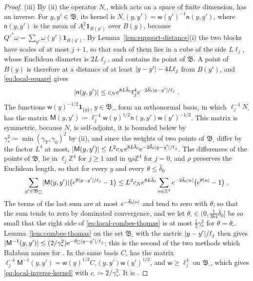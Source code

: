 \documentclass[11pt]{preprint}
\DeclarePairedDelimiter{\abs}{\lvert}{\rvert}
\numberwithin{equation}{section}
\theoremstyle{definition}
\theoremstyle{remark}
\theoremstyle{plain}
\begin{document}
\begin{proof}
(iii) By (ii) the operator $N_\square$, which acts on a space of finite dimension, has an inverse. For $y, y' \in \mathfrak B_\square$ its kernel is $N_\square(y, y') = \mathsf w(y')^{-1}\mathsf n(y, y')$, where $\mathsf n(y, y')$ is the mean of $A_\square^2\mathbf 1_{B(y')}$ over $B(y)$, because $Q'^*\omega = \sum_{y'}\omega(y')\mathbf 1_{B(y')}$. By Lemma~\ref{lem:support-distance}(i) the two blocks have scales of at most $j + 1$, so that each of them lies in a cube of the side $L\ell_j$, whose Euclidean diameter is $2L\ell_j$, and contains its point of $\mathfrak B$. A point of $B(y)$ is therefore at a distance of at least $\abs{y - y'} - 4L\ell_j$ from $B(y')$, and \eqref{eq:local-square} gives
\begin{equation}\label{eq:local-kernel}
    \abs{\mathsf n(y, y')} \leq c_Ne^{8L\bar\delta_0}\ell_j^4e^{-2\bar\delta_0\abs{y - y'}/\ell_j}\;.
\end{equation}
The functions $\mathsf w(y)^{-1/2}\mathbf 1_{\{ y \}}$, $y \in \mathfrak B_\square$, form an orthonormal basis, in which $\ell_j^{-4}N_\square$ has the matrix $\mathsf M(y, y') \coloneqq \ell_j^{-4}\mathsf w(y)^{1/2}\mathsf n(y, y')\mathsf w(y')^{-1/2}$. This matrix is symmetric, because $N_\square$ is self-adjoint, it is bounded below by $\gamma_*^2 \coloneqq \min(\gamma_{\mathsf T}, \gamma_0)^2$ by (ii), and since the weights of two points of $\mathfrak B_\square$ differ by the factor $L^4$ at most, $\abs{\mathsf M(y, y')} \leq L^2c_Ne^{8L\bar\delta_0}e^{-2\bar\delta_0\abs{y - y'}/\ell_j}$. The differences of the points of $\mathfrak B_\square$ lie in $\ell_j\mathbb Z^4$ for $j \geq 1$ and in $\eta\rho\mathbb Z^4$ for $j = 0$, and $\rho$ preserves the Euclidean length, so that for every $y$ and every $\theta \leq \bar\delta_0$
\begin{equation}\label{eq:local-combes-thomas}
    \sum_{y' \in \mathfrak B_\square}\abs{\mathsf M(y, y')}\bigl(e^{\theta\abs{y - y'}/\ell_j} - 1\bigr) \leq L^2c_Ne^{8L\bar\delta_0}\sum_{n \in \mathbb Z^4}e^{-2\bar\delta_0\abs n}\bigl(e^{\theta\abs n} - 1\bigr)\;.
\end{equation}
The terms of the last sum are at most $e^{-\bar\delta_0\abs n}$ and tend to zero with $\theta$, so that the sum tends to zero by dominated convergence, and we let $\theta_\square \in (0, \frac{1}{384}\bar\delta_0]$ be so small that the right side of \eqref{eq:local-combes-thomas} is at most $\frac12\gamma_*^2$ for $\theta = \theta_\square$. Lemma~\ref{lem:combes-thomas} on the set $\mathfrak B_\square$ with the metric $\abs{y - y'}/\ell_j$ then gives $\abs{\mathsf M^{-1}(y, y')} \leq (2/\gamma_*^2)e^{-\theta_\square\abs{y - y'}/\ell_j}$; this is the second of the two methods which Ba{\l}aban names for \cite[(2.79)]{BalabanPRT2}. In the same basis $C_\square$ has the matrix $\ell_j^{-4}\mathsf M^{-1}(y, y') = \mathsf w(y)^{1/2}C_\square(y, y')\mathsf w(y')^{1/2}$, and $\mathsf w \geq \ell_j^4$ on $\mathfrak B_\square$, which gives \eqref{eq:local-inverse-kernel} with $c_\square \coloneqq 2/\gamma_*^2$. It is \cite[(2.81)]{BalabanPRT2}.
\end{proof}
\end{document}
